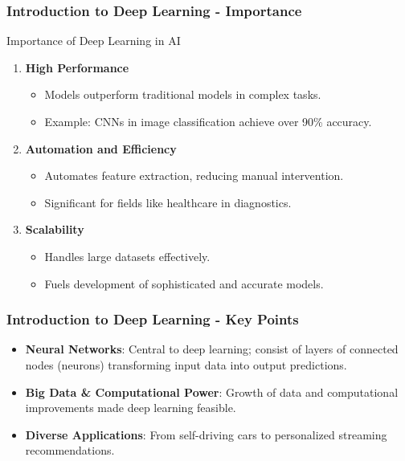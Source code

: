 \documentclass[aspectratio=169]{beamer}
\begin{document}
\begin{frame}[fragile]
    \frametitle{Introduction to Deep Learning - Importance}
    \begin{block}{Importance of Deep Learning in AI}
        \begin{enumerate}
            \item \textbf{High Performance}
                \begin{itemize}
                    \item Models outperform traditional models in complex tasks.
                    \item Example: CNNs in image classification achieve over 90\% accuracy.
                \end{itemize}
            \item \textbf{Automation and Efficiency}
                \begin{itemize}
                    \item Automates feature extraction, reducing manual intervention.
                    \item Significant for fields like healthcare in diagnostics.
                \end{itemize}
            \item \textbf{Scalability}
                \begin{itemize}
                    \item Handles large datasets effectively.
                    \item Fuels development of sophisticated and accurate models.
                \end{itemize}
        \end{enumerate}
    \end{block}
\end{frame}

\begin{frame}[fragile]
    \frametitle{Introduction to Deep Learning - Key Points}
    \begin{itemize}
        \item \textbf{Neural Networks}: Central to deep learning; consist of layers of connected nodes (neurons) transforming input data into output predictions.
        \item \textbf{Big Data \& Computational Power}: Growth of data and computational improvements made deep learning feasible.
        \item \textbf{Diverse Applications}: From self-driving cars to personalized streaming recommendations.
    \end{itemize}
\end{frame}
\end{document}

